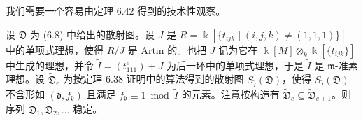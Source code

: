 我们需要一个容易由定理 6.42 得到的技术性观察。

\begin{proposition}
设 $\mathfrak{D}$ 为 (6.8) 中给出的散射图。设 $J$ 是 $R= \Bbbk[\{t_{ijk}\mid(i,j,k)\ne(1,1,1)\}]$ 中的单项式理想，使得 $R/J$ 是 Artin 的。也把 $J$ 记为它在 $ \Bbbk[M]\otimes_ k \Bbbk[\{t_{ijk}\}]$ 中生成的理想，并令 $\tilde I=(t_{111}^e)+J$ 为后一环中的单项式理想，于是 $\tilde I$ 是 $\mathfrak{m}$-准素理想。设 $\tilde{\mathfrak{D}}_e$ 为按定理 6.38 证明中的算法得到的散射图 $S_{\tilde I}(\mathfrak{D})$，使得 $S_{\tilde I}(\mathfrak{D})$ 不含形如 $(\mathfrak{d},f_{\mathfrak{d}})$ 且满足 $f_{\mathfrak{d}}\equiv1\bmod\tilde I$ 的元素。注意按构造有 $\tilde{\mathfrak{D}}_e\subseteq\tilde{\mathfrak{D}}_{e+1}$。则序列 $\tilde{\mathfrak{D}}_1,\tilde{\mathfrak{D}}_2,\dots$ 稳定。
\end{proposition}

